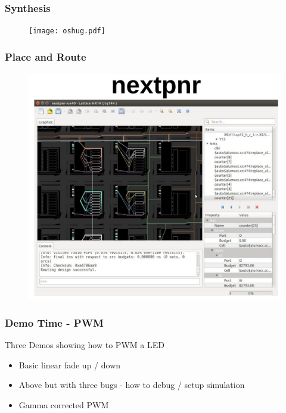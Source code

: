 \documentclass[t]{beamer}
\begin{document}

\begin{frame}[t]
	\frametitle{Synthesis}
	\begin{figure}
		\texttt{[image: oshug.pdf]}
	\end{figure}
\end{frame}

\begin{frame}[t]
	\frametitle{Place and Route}
	\begin{figure}
		\includegraphics[width=0.7\linewidth]{nextpnr.png}
	\end{figure}
\end{frame}


\begin{frame}[t]
	\frametitle{Demo Time - PWM}
	Three Demos showing how to PWM a LED
	\begin{itemize}
		\item Basic linear fade up / down
		\item Above but with three bugs - how to debug / setup simulation
		\item Gamma corrected PWM
	\end{itemize}
\end{frame}

\end{document}
